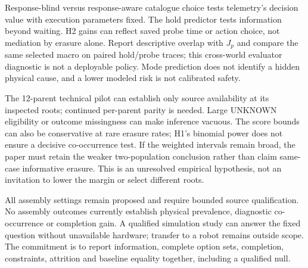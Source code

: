 Response-blind versus response-aware catalogue choice tests telemetry's decision value with execution parameters fixed. The hold predictor tests information beyond waiting. H2 gains can reflect saved probe time or action choice, not mediation by erasure alone. Report descriptive overlap with $J_p$ and compare the same selected macro on paired hold/probe traces; this cross-world evaluator diagnostic is not a deployable policy. Mode prediction does not identify a hidden physical cause, and a lower modeled risk is not calibrated safety.

The 12-parent technical pilot can establish only source availability at its inspected roots; continued per-parent parity is needed. Large UNKNOWN eligibility or outcome missingness can make inference vacuous. The score bounds can also be conservative at rare erasure rates; H1's binomial power does not ensure a decisive co-occurrence test. If the weighted intervals remain broad, the paper must retain the weaker two-population conclusion rather than claim same-case informative erasure. This is an unresolved empirical hypothesis, not an invitation to lower the margin or select different roots.

All assembly settings remain proposed and require bounded source qualification. No assembly outcomes currently establish physical prevalence, diagnostic co-occurrence or completion gain. A qualified simulation study can answer the fixed question without unavailable hardware; transfer to a robot remains outside scope. The commitment is to report information, complete option sets, completion, constraints, attrition and baseline equality together, including a qualified null.
